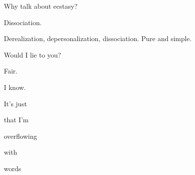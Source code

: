 \newpage


\noindent Why talk about ecstasy?


\noindent Dissociation.


\noindent Derealization, depersonalization, dissociation. Pure and simple.


\noindent Would I lie to you?


\noindent Fair.
\newpage


\noindent I know.

\vspace{2cm}

\noindent It's just

\vfill

\noindent that I'm
\newpage


\null
\vfill
\noindent overflowing
\vfill
\newpage

\null
\vfill
\begin{center}
    with
\end{center}
\vfill
\newpage

\null
\vfill
\begin{flushright}
    words
\end{flushright}
\vfill
\newpage

